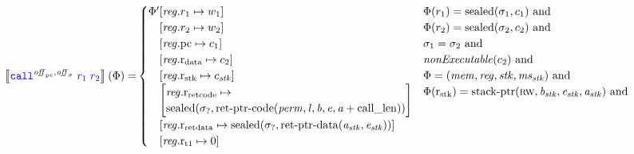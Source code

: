\documentclass[a4paper]{article}
\begin{document}
\begin{align*}
  \sem{\scall{\offpc,\offsigma}{\src{r_1}}{\src{r_2}}}(\Phi) = & 
                                               \begin{cases}
                                                 \Phi'
                                                 \arraycolsep=0pt
                                                 \begin{array}[t]{rl}
                                                   &\updReg{r_1}{w_1} \\
                                                        &\updReg{r_2}{w_2} \\
                                                        &\updReg{\pcreg}{c_1}\\
                                                        &\updReg{\rdata}{c_2}\\
                                                        &\updReg{\rstk}{c_\stk}\\
                                                        &\left[
\arraycolsep=0pt\array{l}
\reg.\rretc \mapsto \\
\hfill \sealed{\sigma_?,\retptrc(\perm,\lin,\baddr,\eaddr,\aaddr+\calllen)}
\endarray
\right]\\
                                                        &\updReg{\rretd}{\sealed{\sigma_?,\retptrd(\aaddr_\stk,\eaddr_\stk)}}\\
                                                        &\updReg{\rtmp{1}}{0}
                                                 \end{array}
                                                 & 
                                                 \arraycolsep=0pt
                                                 \begin{array}[t]{l}
                                                   \Phi(r_1) = \sealed{\sigma_1,c_1} \tand \\
                                                   \Phi(r_2) = \sealed{\sigma_2,c_2} \tand \\
                                                   \sigma_1 = \sigma_2 \tand \\
                                                   \nonExec{c_2} \tand\\
                                                   \Phi = (\mem,\reg,\stk,\ms_\stk) \tand\\
                                                   \Phi(\rstk) = \stkptr{\rw,\baddr_\stk,\eaddr_\stk,\aaddr_\stk} \tand \\

\end{array}
\end{cases}
\end{align*}
\end{document}
